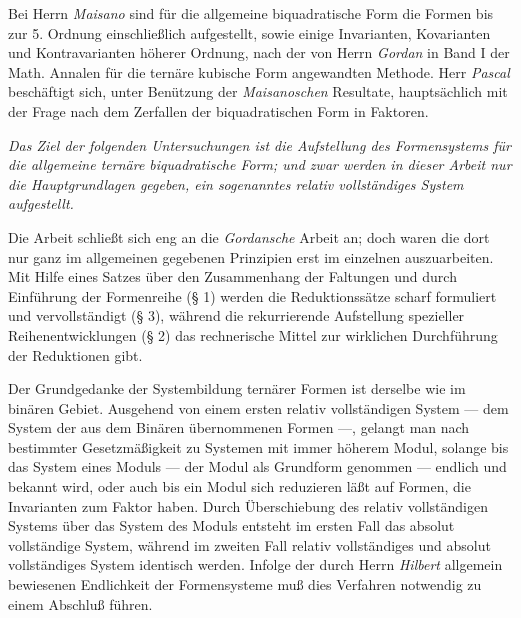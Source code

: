 Bei Herrn \emph{Maisano} sind für die allgemeine biquadratische Form die Formen bis zur 5. Ordnung einschließlich aufgestellt, sowie einige Invarianten, Kovarianten und Kontravarianten höherer Ordnung, nach der von Herrn \emph{Gordan} in Band I der Math. Annalen für die ternäre kubische Form angewandten Methode. Herr \emph{Pascal} beschäftigt sich, unter Benützung der \emph{Maisanoschen} Resultate, hauptsächlich mit der Frage nach dem Zerfallen der biquadratischen Form in Faktoren.

\emph{Das Ziel der folgenden Untersuchungen ist die Aufstellung des Formensystems für die allgemeine ternäre biquadratische Form; und zwar werden in dieser Arbeit nur die Hauptgrundlagen gegeben, ein sogenanntes \glqq{}relativ vollständiges System\grqq{}}\emph{ aufgestellt.}

Die Arbeit schließt sich eng an die \emph{Gordansche} Arbeit an; doch waren die dort nur ganz im allgemeinen gegebenen Prinzipien erst im einzelnen auszuarbeiten. Mit Hilfe eines Satzes über den Zusammenhang der Faltungen und durch Einführung der \glqq{}Formenreihe\grqq{} (§ 1) werden die Reduktionssätze scharf formuliert und vervollständigt (§ 3), während die rekurrierende Aufstellung spezieller Reihenentwicklungen (§ 2) das rechnerische Mittel zur wirklichen Durchführung der Reduktionen gibt.

Der Grundgedanke der Systembildung ternärer Formen ist derselbe wie im binären Gebiet. Ausgehend von einem ersten relativ vollständigen System --- dem System der aus dem Binären übernommenen Formen ---, gelangt man nach bestimmter Gesetzmäßigkeit zu Systemen mit immer höherem Modul, solange bis das System eines Moduls --- der Modul als Grundform genommen --- endlich und bekannt wird, oder auch bis ein Modul sich reduzieren läßt auf Formen, die Invarianten zum Faktor haben. Durch Überschiebung des relativ vollständigen Systems über das System des Moduls entsteht im ersten Fall das absolut vollständige System, während im zweiten Fall relativ vollständiges und absolut vollständiges System identisch werden. Infolge der durch Herrn \emph{Hilbert} allgemein bewiesenen Endlichkeit der Formensysteme muß dies Verfahren notwendig zu einem Abschluß führen.

